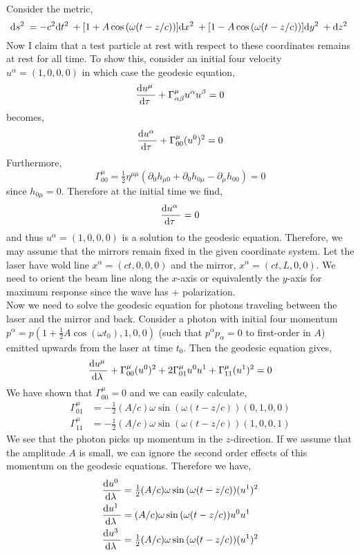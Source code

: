 \documentclass[12pt]{article}
\begin{document}
Consider the metric,
\[ \mathrm{d}s^2 \: = - c^2 \mathrm{d}t^2 \: + [1 + A \cos{(\omega(t - z/c))}] \mathrm{d}x^2 \: + [1 - A \cos{(\omega (t - z/c))}] \mathrm{d}y^2 \: + \mathrm{d}z^2 \: \]
Now I claim that a test particle at rest with respect to these coordinates remains at rest for all time. To show this, consider an initial four velocity $u^\alpha = (1, 0, 0, 0)$ in which case the geodesic equation,
\[ \frac{\mathrm{d}u^\mu \:}{\mathrm{d}\tau \:} + \Gamma^\mu_{\alpha \beta} u^\alpha u^\beta = 0 \]
becomes,
\[ \frac{\mathrm{d}u^\alpha \:}{\mathrm{d}\tau \:} + \Gamma^\mu_{00} (u^0)^2 = 0 \]
Furthermore,
\[ \Gamma^\mu_{00} = \tfrac{1}{2} \eta^{\mu \mu} ( \partial_0 h_{\mu 0} + \partial_0 h_{0 \mu} - \partial_\mu h_{00} ) = 0 \]
since $h_{0 \mu} = 0$. Therefore at the initial time we find,
\[ \frac{\mathrm{d}u^\alpha \:}{\mathrm{d}\tau \:} = 0 \]
and thus $u^\alpha = (1, 0, 0, 0)$ is a solution to the geodesic equation. Therefore, we may assume that the mirrors remain fixed in the given coordinate system. Let the laser have wold line $x^\alpha = (ct, 0, 0, 0)$ and the mirror, $x^\alpha = (ct, L, 0, 0)$. We need to orient the beam line along the $x$-axis or equivalently the $y$-axis for maximum response since the wave has $+$ polarization. 
\bigskip\\
Now we need to solve the geodesic equation for photons traveling between the laser and the mirror and back. Consider a photon with initial four momentum $p^\alpha = p (1 + \tfrac{1}{2} A \cos{(\omega t_0)}, 1, 0, 0)$ (such that $p^\alpha p_\alpha = 0$ to first-order in $A$) emitted upwards from the laser at time $t_0$. Then the geodesic equation gives,
\[ \frac{\mathrm{d}u^\mu \:}{\mathrm{d}\lambda \:} + \Gamma^\mu_{00} (u^0)^2 + 2 \Gamma^\mu_{01} u^0 u^1 + \Gamma^\mu_{11} (u^1)^2 = 0 \]
We have shown that $\Gamma^\mu_{00} = 0$ and we can easily calculate,
\begin{align*}
\Gamma^\mu_{01} & = - \tfrac{1}{2} (A/c) \omega \sin{(\omega (t - z/c))} (0, 1, 0, 0)
\\
\Gamma^\mu_{11} & =  - \tfrac{1}{2} (A/c) \omega \sin{(\omega (t - z/c))} (1, 0, 0, 1)
\end{align*}
We see that the photon picks up momentum in the $z$-direction. If we assume that the amplitude $A$ is small, we can ignore the second order effects of this momentum on the geodesic equations. Therefore we have,
\begin{align*}
\frac{\mathrm{d}u^0 \:}{\mathrm{d}\lambda \:} & = \tfrac{1}{2} (A/c) \omega \sin{(\omega (t - z/c))} (u^1)^2
\\
\frac{\mathrm{d}u^1 \:}{\mathrm{d}\lambda \:} & = (A/c) \omega \sin{(\omega (t - z/c))} u^0 u^1
\\
\frac{\mathrm{d}u^3 \:}{\mathrm{d}\lambda \:} & = \tfrac{1}{2} (A/c) \omega \sin{(\omega (t - z/c))} (u^1)^2
\end{align*}
\end{document}
